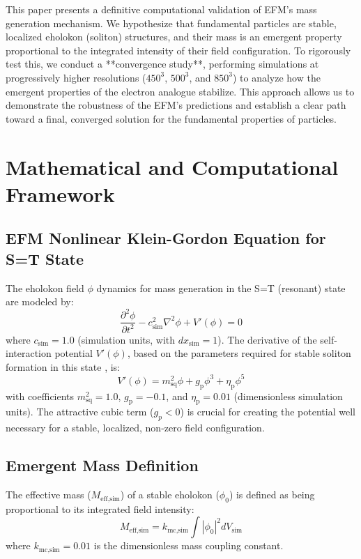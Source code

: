 \documentclass[11pt]{article}
\begin{document}
This paper presents a definitive computational validation of EFM's mass generation mechanism. We hypothesize that fundamental particles are stable, localized eholokon (soliton) structures, and their mass is an emergent property proportional to the integrated intensity of their field configuration. To rigorously test this, we conduct a **convergence study**, performing simulations at progressively higher resolutions (\(450^3\), \(500^3\), and \(850^3\)) to analyze how the emergent properties of the electron analogue stabilize. This approach allows us to demonstrate the robustness of the EFM's predictions and establish a clear path toward a final, converged solution for the fundamental properties of particles.

\section{Mathematical and Computational Framework}

\subsection{EFM Nonlinear Klein-Gordon Equation for S=T State}
The eholokon field \(\phi\) dynamics for mass generation in the S=T (resonant) state are modeled by:
\begin{equation}
\frac{\partial^2 \phi}{\partial t^2} - c_{\text{sim}}^2 \nabla^2 \phi + V'(\phi) = 0
\label{eq:nlkg_massgen}
\end{equation}
where \(c_{\text{sim}}=1.0\) (simulation units, with \(dx_{\text{sim}}=1\)). The derivative of the self-interaction potential \(V'(\phi)\), based on the parameters required for stable soliton formation in this state \citep{emvula2025dimensionless_params}, is:
\begin{equation}
V'(\phi) = m_{\text{sq}}^2 \phi + g_{\text{p}} \phi^3 + \eta_{\text{p}} \phi^5
\label{eq:potential_derivative}
\end{equation}
with coefficients \(m_{\text{sq}}^2 = 1.0\), \(g_{\text{p}} = -0.1\), and \(\eta_{\text{p}} = 0.01\) (dimensionless simulation units). The attractive cubic term ($g_p < 0$) is crucial for creating the potential well necessary for a stable, localized, non-zero field configuration.

\subsection{Emergent Mass Definition}
The effective mass (\(M_{\text{eff,sim}}\)) of a stable eholokon (\(\phi_0\)) is defined as being proportional to its integrated field intensity:
\begin{equation}
M_{\text{eff,sim}} = k_{\text{mc,sim}} \int |\phi_0|^2 dV_{\text{sim}}
\label{eq:mass_definition}
\end{equation}
where \(k_{\text{mc,sim}} = 0.01\) is the dimensionless mass coupling constant.
\end{document}
